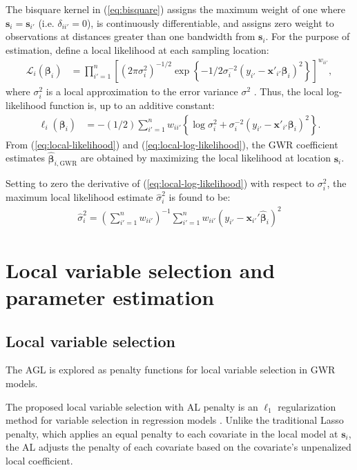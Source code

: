 \documentclass[authoryear, review, 11pt]{elsarticle}
\begin{document}
	The bisquare kernel in (\ref{eq:bisquare}) assigns the maximum weight of one where $\bm{s}_i = \bm{s}_{i'}$ (i.e. $\delta_{ii'}=0$), is continuously differentiable, and assigns zero weight to observations at distances greater than one bandwidth from $\bm{s}_i$. For the purpose of estimation, define a local likelihood at each sampling location:
	\begin{align}\label{eq:local-likelihood}
		\mathcal{L}_i \left(\bm{\beta}_i \right) &= \prod_{i'=1}^n \left[ \left(2 \pi \sigma^2_i  \right)^{-1/2}  \exp\left\{- 1/2 \sigma^{-2}_i  \left(y_{i'} - \bm{x}'_{i'} \bm{\beta}_i \right)^2 \right\} \right] ^ {w_{ii'}},
	\end{align}			
	where $\sigma_i^2$ is a local approximation to the error variance $\sigma^2$ \citep{Fotheringham:2002}. Thus, the local log-likelihood function is, up to an additive constant: 
	\begin{align}\label{eq:local-log-likelihood}
		\ell_i\left(\bm{\beta}_i\right) &= -(1/2) \sum_{i'=1}^n w_{ii'} \left\{ \log{\sigma^2_i}  + \sigma^{-2}_i  \left(y_{i'} - \bm{x}'_{i'} \bm{\beta}_i \right)^2 \right\}.
	\end{align}
	From (\ref{eq:local-likelihood}) and (\ref{eq:local-log-likelihood}), the GWR coefficient estimates $\hat{\bm{\beta}}_{i,\text{GWR}}$ are obtained by maximizing the local likelihood at location $\bm{s}_i$.
	
	 Setting to zero the derivative of (\ref{eq:local-log-likelihood}) with respect to $\sigma_i^2$, the maximum local likelihood estimate $\hat{\sigma}_i^2$ is found to be:	 
	 \begin{align}
	 	\hat{\sigma}_i^2 = \left(\sum \limits_{i'=1}^{n} w_{ii'} \right)^{-1} \sum \limits_{i'=1}^n w_{ii'}\left(y_{i'} - \bm{x}_{i'}'\hat{\bm{\beta}}_i\right)^2
	\end{align}	
	 
	
\section{Local variable selection and parameter estimation \label{section:model-selection}}
	\subsection{Local variable selection}
	The AGL is explored as penalty functions for local variable selection in GWR models.
	
	The proposed local variable selection with AL penalty is an $\ell_1$ regularization method for variable selection in regression models \citep{Zou:2006}. Unlike the traditional Lasso penalty, which applies an equal penalty to each covariate in the local model at $\bm{s}_i$, the AL adjusts the penalty of each covariate based on the covariate's unpenalized local coefficient.
	
\end{document}

